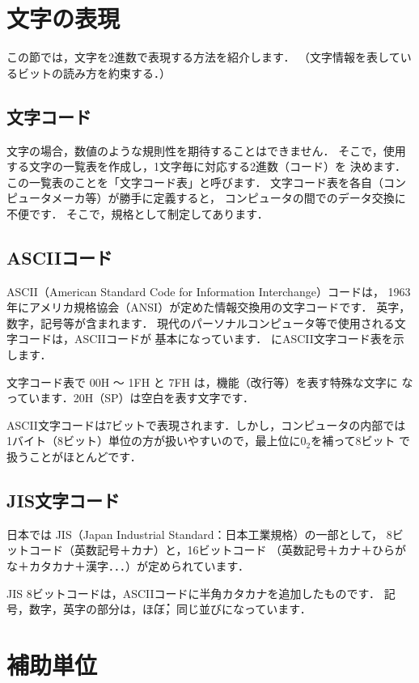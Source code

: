 \section{文字の表現}
\label{char}

この節では，文字を2進数で表現する方法を紹介します．
（文字情報を表しているビットの読み方を約束する．）

\subsection{文字コード}
文字の場合，数値のような規則性を期待することはできません．
そこで，使用する文字の一覧表を作成し，1文字毎に対応する2進数（コード）を
決めます．
この一覧表のことを「文字コード表」と呼びます．
文字コード表を各自（コンピュータメーカ等）が勝手に定義すると，
コンピュータの間でのデータ交換に不便です．
そこで，規格として制定してあります．

\subsection{ASCIIコード}
\label{ascii}
ASCII（American Standard Code for Information Interchange）コードは，
1963年にアメリカ規格協会（ANSI）が定めた情報交換用の文字コードです．
英字，数字，記号等が含まれます．
現代のパーソナルコンピュータ等で使用される文字コードは，ASCIIコードが
基本になっています．
にASCII文字コード表を示します．


文字コード表で 00H 〜 1FH と 7FH は，機能（改行等）を表す特殊な文字に
なっています．20H（SP）は空白を表す文字です．

ASCII文字コードは7ビットで表現されます．しかし，コンピュータの内部では
1バイト（8ビット）単位の方が扱いやすいので，最上位に$0_2$を補って8ビット
で扱うことがほとんどです．

\subsection{JIS文字コード}
日本では JIS（Japan Industrial Standard：日本工業規格）の一部として，
8ビットコード（英数記号＋カナ）と，16ビットコード
（英数記号＋カナ＋ひらがな＋カタカナ＋漢字．．．）が定められています．

JIS 8ビットコードは，ASCIIコードに半角カタカナを追加したものです．
記号，数字，英字の部分は，\.ほ\.ぼ，同じ並びになっています．

\section{補助単位}

